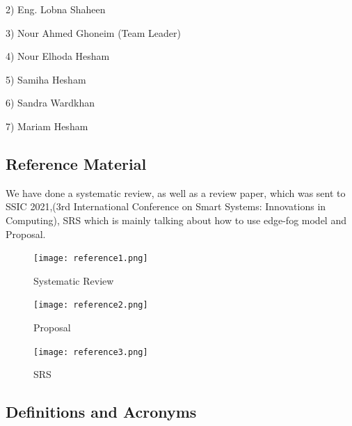 \documentclass[12pt]{article}
\begin{document}
2)	Eng. Lobna Shaheen

3)	Nour Ahmed Ghoneim (Team Leader)

4)	Nour Elhoda Hesham

5)	Samiha Hesham

6)	Sandra Wardkhan

7)	Mariam Hesham



\subsection{Reference Material}
We have done a  systematic review, as well as a review paper, which was sent to SSIC 2021,(3rd International Conference on Smart Systems: Innovations in Computing), SRS which is mainly talking about how to use edge-fog model and  Proposal.

\begin{figure}[htbp]
\centering
\texttt{[image: reference1.png]}
\caption{Systematic Review}
\label{archdsgn}
\end{figure}
\FloatBarrier

\begin{figure}[htbp]
\centering
\texttt{[image: reference2.png]}
\caption{Proposal}
\label{archdsgn}
\end{figure}
\FloatBarrier

\begin{figure}[htbp]
\centering
\texttt{[image: reference3.png]}
\caption{SRS}
\label{archdsgn}
\end{figure}
\FloatBarrier

\subsection{Definitions and Acronyms}
\end{document}
